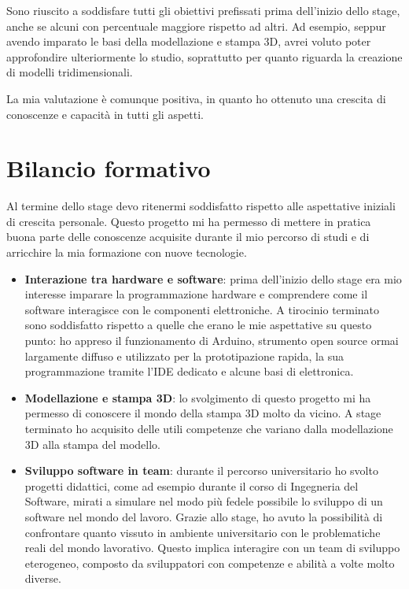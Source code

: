Sono riuscito a soddisfare tutti gli obiettivi prefissati prima dell'inizio dello stage, anche se alcuni con percentuale maggiore rispetto ad altri. Ad esempio, seppur avendo imparato le basi della modellazione e stampa 3D, avrei voluto poter approfondire ulteriormente lo studio, soprattutto per quanto riguarda la creazione di modelli tridimensionali.

La mia valutazione è comunque positiva, in quanto ho ottenuto una crescita di conoscenze e capacità in tutti gli aspetti.



\section{Bilancio formativo}

Al termine dello stage devo ritenermi soddisfatto rispetto alle aspettative iniziali di crescita personale. Questo progetto mi ha permesso di mettere in pratica buona parte delle conoscenze acquisite durante il mio percorso di studi e di arricchire la mia formazione con nuove tecnologie.

\begin{itemize}
\item \textbf{Interazione tra hardware e software}: prima dell'inizio dello stage era mio interesse imparare la programmazione hardware e comprendere come il software interagisce con le componenti elettroniche. A tirocinio terminato sono soddisfatto rispetto a quelle che erano le mie aspettative su questo punto: ho appreso il funzionamento di Arduino, strumento open source ormai largamente diffuso e utilizzato per la prototipazione rapida, la sua programmazione tramite l'IDE dedicato e alcune basi di elettronica.
\item \textbf{Modellazione e stampa 3D}: lo svolgimento di questo progetto mi ha permesso di conoscere il mondo della stampa 3D molto da vicino. A stage terminato ho acquisito delle utili competenze che variano dalla modellazione 3D alla stampa del modello.
\item \textbf{Sviluppo software in team}: durante il percorso universitario ho svolto progetti didattici, come ad esempio durante il corso di Ingegneria del Software, mirati a simulare nel modo più fedele possibile lo sviluppo di un software nel mondo del lavoro. Grazie allo stage, ho avuto la possibilità di confrontare quanto vissuto in ambiente universitario con le problematiche reali del mondo lavorativo. Questo implica interagire con un team di sviluppo eterogeneo, composto da sviluppatori con competenze e abilità a volte molto diverse.
\end{itemize}

